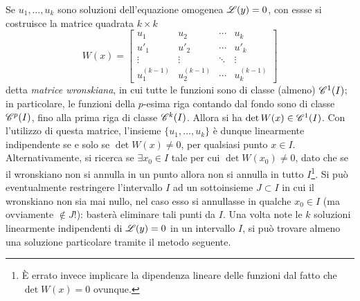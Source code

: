Se $u_1,\dots,u_k$ sono soluzioni dell'equazione omogenea $\lin(y)=0$, con essse si costruisce la matrice quadrata $k\times k$
\[
W(x)=\begin{bmatrix}
u_1			&u_2				&\cdots	&u_k\\
u'_1			&u'_2			&\cdots	&u'_k\\
\vdots		&\vdots			&\ddots	&\vdots\\
u^{(k-1)}_1	&u^{(k-1)}_2		&\cdots	&u^{(k-1)}_k
\end{bmatrix}
\]
detta \emph{matrice wronskiana}, in cui tutte le funzioni sono di classe (almeno) $\cont[1]{I}$; in particolare, le funzioni della $p$-esima riga contando dal fondo sono di classe $\cont[p]{I}$, fino alla prima riga di classe $\cont[k]{I}$. Allora si ha $\det W(x)\in\cont[1]{I}$.
Con l'utilizzo di questa matrice, l'insieme $\{u_1,\dots,u_k\}$ è dunque linearmente indipendente se e solo se $\det W(x)\neq 0$, per qualsiasi punto $x\in I$. Alternativamente, si ricerca se $\exists x_0\in I$ tale per cui $\det W(x_0)\neq 0$, dato che se il wronskiano non si annulla in un punto allora non si annulla in tutto $I$\footnote{È errato invece implicare la dipendenza lineare delle funzioni dal fatto che $\det W(x)=0$ ovunque.}.
Si può eventualmente restringere l'intervallo $I$ ad un sottoinsieme $J\subset I$ in cui il wronskiano non sia mai nullo, nel caso esso si annullasse in qualche $x_0\in I$ (ma ovviamente $\notin J$!): basterà eliminare tali punti da $I$.
Una volta note le $k$ soluzioni linearmente indipendenti di $\lin(y)=0$ in un intervallo $I$, si può trovare almeno una soluzione particolare tramite il metodo seguente.

